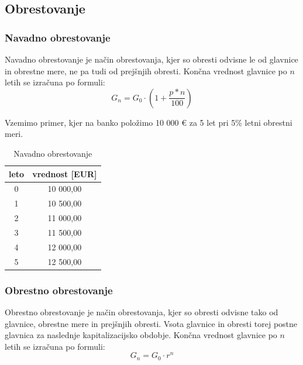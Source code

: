 \documentclass[12pt]{article}
\begin{document}
    \subsection{Obrestovanje}
        \subsubsection{Navadno obrestovanje}
        Navadno obrestovanje je način obrestovanja, kjer so obresti odvisne le od glavnice
        in obrestne mere, ne pa tudi od prejšnjih obresti. Končna vrednost glavnice po $n$
        letih se izračuna po formuli:
        \begin{equation}
            G_n = G_0 \cdot (1 + \frac{p*n}{100})
        \end{equation}

        Vzemimo primer, kjer na banko položimo 10 000 € za 5 let pri 5\% letni obrestni meri. 
        \begin{center}
            \begin{table}[h!]
                \centering
                \begin{tabular}{|c|c|}
                    \hline
                    \textbf{leto} & \textbf{vrednost [EUR]} \\ \hline
                    0 & 10 000,00 \\ \hline
                    1 & 10 500,00 \\ \hline
                    2 & 11 000,00 \\ \hline
                    3 & 11 500,00 \\ \hline
                    4 & 12 000,00 \\ \hline
                    5 & 12 500,00 \\ \hline
                \end{tabular}
                \caption{Navadno obrestovanje}
            \end{table}
        \end{center}

        \subsubsection{Obrestno obrestovanje}
        Obrestno obrestovanje je način obrestovanja, kjer so obresti odvisne tako od 
        glavnice, obrestne mere in prejšnjih obresti. Vsota glavnice in obresti torej 
        postne glavnica za naslednje kapitalizacijsko obdobje. Končna vrednost glavnice 
        po $n$ letih se izračuna po formuli:
        \begin{equation}
            G_n = G_0 \cdot r^n
        \end{equation}
\end{document}
